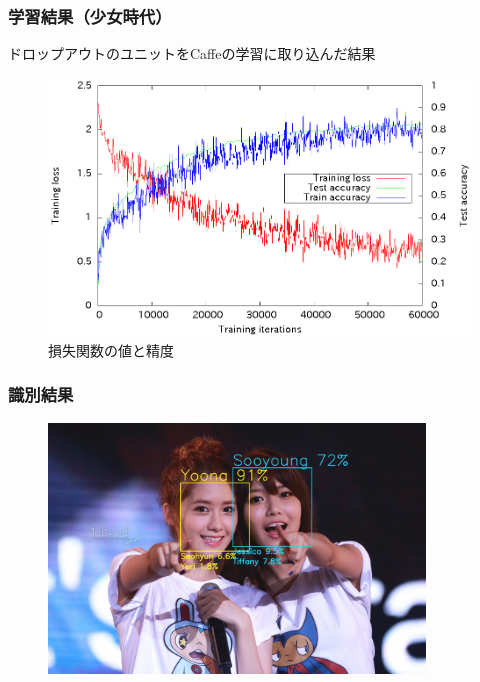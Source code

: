 \documentclass[dvipdfmx,11pt,notheorems]{beamer}
\theoremstyle{definition}
\begin{document}
\begin{frame}\frametitle{学習結果（少女時代）}
ドロップアウトのユニットをCaffeの学習に取り込んだ結果
\begin{figure}[ht]
  \centering
  \includegraphics[scale=0.85]{fig/eps/result_dropout_test_graph_snsd.eps}
  \caption{損失関数の値と精度}
\end{figure}
\end{frame}

\begin{frame}\frametitle{識別結果}
\begin{figure}[t]
  \begin{center}
    \includegraphics[clip,width=10cm, bb = 0 0 1500 1000]{./fig/jpg/yoona_sooyoung.jpg}\\
  \end{center}
\end{figure}
\end{frame}
\end{document}
